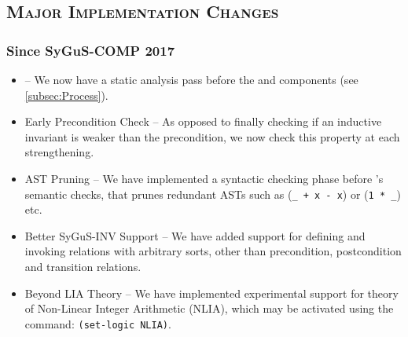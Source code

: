 \documentclass[conference]{IEEEtran}
\begin{document}
\subsection*{\textsc{Major Implementation Changes}}

\subsubsection*{Since SyGuS-COMP 2017}
\begin{itemize}
    \item \Process --
          We now have a static analysis pass before the \Record and \Infer components (see \cref{subsec:Process}).

    \item Early Precondition Check --
          As opposed to finally checking if an inductive invariant is weaker than the precondition,
          we now check this property at each strengthening.

    \item AST Pruning --
          We have implemented a syntactic checking phase before 's semantic checks,
          that prunes redundant ASTs such as (\texttt{\_ + x - x}) or (\texttt{1 * \_}) etc.

    \item Better SyGuS-INV Support --
          We have added support for defining and invoking relations with arbitrary sorts,
          other than precondition, postcondition and transition relations.

    \item Beyond LIA Theory --
          We have implemented experimental support for theory of Non-Linear Integer Arithmetic (NLIA),
          which may be activated using the command: \texttt{(set-logic NLIA)}.
\end{itemize}
\end{document}
